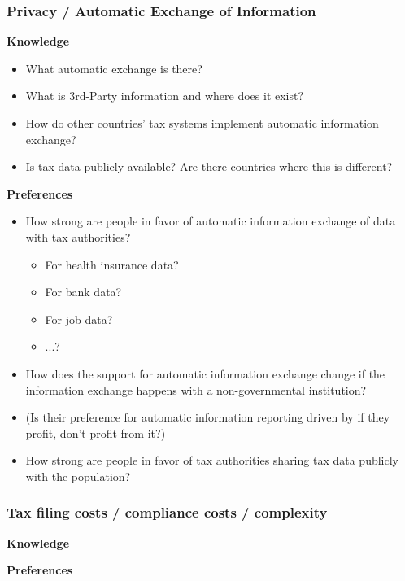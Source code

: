 \documentclass[a4paper, 12pt]{article}
\begin{document}
\subsubsection{Privacy / Automatic Exchange of Information}
\textbf{Knowledge}
\begin{itemize}
    \item What automatic exchange is there? 
    \item What is 3rd-Party information and where does it exist? 
    \item How do other countries' tax systems implement automatic information exchange? 
    \item Is tax data publicly available? Are there countries where this is different?
\end{itemize}
\textbf{Preferences}
\begin{itemize}
    \item How strong are people in favor of automatic information exchange of data with tax authorities?
        \begin{itemize}
        \item For health insurance data?
        \item For bank data?
        \item For job data? 
        \item ...?
    \end{itemize}
    \item How does the support for automatic information exchange change if the information exchange happens with a non-governmental institution?
    \item (Is their preference for automatic information reporting driven by if they profit, don't profit from it?)
    \item How strong are people in favor of tax authorities sharing tax data publicly with the population?
\end{itemize}
\subsubsection{Tax filing costs / compliance costs / complexity}
\textbf{Knowledge}


\textbf{Preferences}
\end{document}
